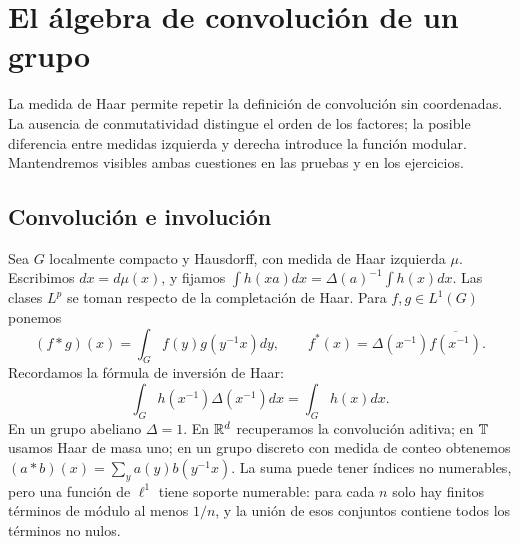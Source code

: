 \chapter{El álgebra de convolución de un grupo}\label{cap:v4-12}
La medida de Haar permite repetir la definición de convolución sin coordenadas. La ausencia de conmutatividad distingue el orden de los factores; la posible diferencia entre medidas izquierda y derecha introduce la función modular. Mantendremos visibles ambas cuestiones en las pruebas y en los ejercicios.

\section{Convolución e involución}\label{lectura:v4-22}
Sea $G$ localmente compacto y Hausdorff, con medida de Haar izquierda $\mu$. Escribimos $dx=d\mu(x)$, y fijamos $\int h(xa)dx=\Delta(a)^{-1}\int h(x)dx$. Las clases $L^p$ se toman respecto de la completación de Haar. Para $f,g\in L^1(G)$ ponemos
\begin{equation}\label{v4-l24-d:algebra}
 (f*g)(x)=\int_Gf(y)g(y^{-1}x)dy,\qquad
 f^*(x)=\Delta(x^{-1})\overline{f(x^{-1})}.
\end{equation}
Recordamos la fórmula de inversión de Haar:
\begin{equation}\label{v4-l24-eq:inv}
 \int_Gh(x^{-1})\Delta(x^{-1})dx=\int_Gh(x)dx.
\end{equation}
En un grupo abeliano $\Delta=1$. En $\mathbb R^d$ recuperamos la convolución aditiva; en $\mathbb T$ usamos Haar de masa uno; en un grupo discreto con medida de conteo obtenemos $(a*b)(x)=\sum_y a(y)b(y^{-1}x)$. La suma puede tener índices no numerables, pero una función de $\ell^1$ tiene soporte numerable: para cada $n$ solo hay finitos términos de módulo al menos $1/n$, y la unión de esos conjuntos contiene todos los términos no nulos.

